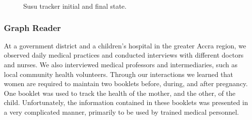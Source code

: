 \documentclass{sig-alternate}
\begin{document}
\begin{figure}%
    \centering
    \qquad
    \caption{Susu tracker initial and final state.}%
    \label{fig:susu}%
\end{figure}

\subsubsection{Graph Reader}

At a government district and a children's hospital in the greater Accra region, we observed daily medical practices and conducted interviews with different doctors and nurses. We also interviewed medical professors and intermediaries, such as local community health volunteers. Through our interactions we learned that women are required to maintain two booklets before, during, and after pregnancy. One booklet was used to track the health of the mother, and the other, of the child. Unfortunately, the information contained in these booklets was presented in a very complicated manner, primarily to be used by trained medical personnel.
\end{document}
